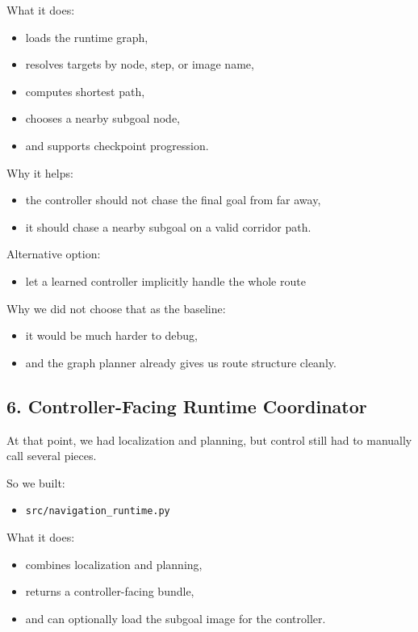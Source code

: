 \documentclass[11pt,a4paper]{article}
\begin{document}
What it does:

\begin{itemize}[nosep]
  \item loads the runtime graph,
  \item resolves targets by node, step, or image name,
  \item computes shortest path,
  \item chooses a nearby subgoal node,
  \item and supports checkpoint progression.
\end{itemize}

Why it helps:

\begin{itemize}[nosep]
  \item the controller should not chase the final goal from far away,
  \item it should chase a nearby subgoal on a valid corridor path.
\end{itemize}

Alternative option:

\begin{itemize}[nosep]
  \item let a learned controller implicitly handle the whole route
\end{itemize}

Why we did not choose that as the baseline:

\begin{itemize}[nosep]
  \item it would be much harder to debug,
  \item and the graph planner already gives us route structure cleanly.
\end{itemize}


\subsection{6. Controller-Facing Runtime Coordinator}

At that point, we had localization and planning, but control still had to
manually call several pieces.

So we built:

\begin{itemize}[nosep]
  \item \texttt{src/navigation\_runtime.py}
\end{itemize}

What it does:

\begin{itemize}[nosep]
  \item combines localization and planning,
  \item returns a controller-facing bundle,
  \item and can optionally load the subgoal image for the controller.
\end{itemize}
\end{document}
